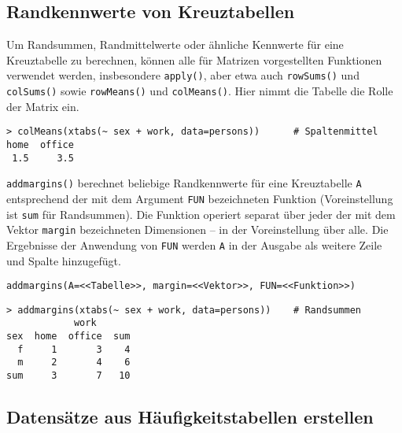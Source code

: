 \subsection{Randkennwerte von Kreuztabellen}

Um Randsummen, Randmittelwerte oder ähnliche Kennwerte für eine Kreuztabelle zu berechnen, können alle für Matrizen vorgestellten Funktionen verwendet werden, insbesondere \lstinline!apply()!, aber etwa auch \lstinline!rowSums()! und \lstinline!colSums()! sowie \lstinline!rowMeans()! und \lstinline!colMeans()!. Hier nimmt die Tabelle die Rolle der Matrix ein.
\begin{lstlisting}
> colMeans(xtabs(~ sex + work, data=persons))      # Spaltenmittel
home  office
 1.5     3.5
\end{lstlisting}

\lstinline!addmargins()! berechnet beliebige Randkennwerte für eine Kreuztabelle \lstinline!A! entsprechend der mit dem Argument \lstinline!FUN! bezeichneten Funktion (Voreinstellung ist \lstinline!sum! für Randsummen). Die Funktion operiert separat über jeder der mit dem Vektor \lstinline!margin! bezeichneten Dimensionen -- in der Voreinstellung über alle. Die Ergebnisse der Anwendung von \lstinline!FUN! werden \lstinline!A! in der Ausgabe als weitere Zeile und Spalte hinzugefügt.
\begin{lstlisting}
addmargins(A=<<Tabelle>>, margin=<<Vektor>>, FUN=<<Funktion>>)
\end{lstlisting}

\begin{lstlisting}
> addmargins(xtabs(~ sex + work, data=persons))    # Randsummen
            work
sex  home  office  sum
  f     1       3    4
  m     2       4    6
sum     3       7   10
\end{lstlisting}

\subsection{Datensätze aus Häufigkeitstabellen erstellen}
\label{sec:tab2df}

